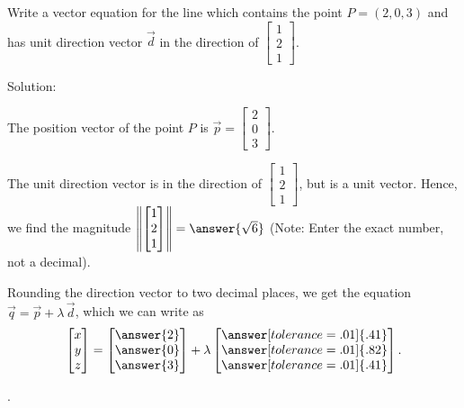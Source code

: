 \documentclass{ximera}
\begin{document}
\begin{example}\label{ex:line-point-and-direction-vector}

  Write a vector equation for the line which contains the point
  $P = (2,0,3)$ and has unit direction vector $\vec{d}$ in the direction of 
  $\begin{bmatrix}1\\2\\1\end{bmatrix}$.



Solution:

  The position vector of the point $P$ is
  $\vec{p}=\begin{bmatrix}2\\0\\3\end{bmatrix}$. 

  The unit direction vector is in the direction of $\begin{bmatrix}1\\2\\1\end{bmatrix}$, but is a unit vector. Hence, we find the magnitude $\norm{\begin{bmatrix}1\\2\\1\end{bmatrix}}=\answer{\sqrt{6}}$ (Note: Enter the exact number, not a decimal).
  
  Rounding the direction vector to two decimal places, we get the equation 
  $\vec{q}= \vec{p} + \lambda\,\vec{d}$, which we can write as
  \begin{equation*}
    \begin{bmatrix} x \\ y \\ z \end{bmatrix}
    = \begin{bmatrix} \answer{2} \\ \answer{0} \\ \answer{3} \end{bmatrix}
    + \lambda \begin{bmatrix} \answer[tolerance=.01]{.41} \\ \answer[tolerance=.01]{.82} \\ \answer[tolerance=.01]{.41} \end{bmatrix}.
  \end{equation*}
\end{example}.
\end{document}
